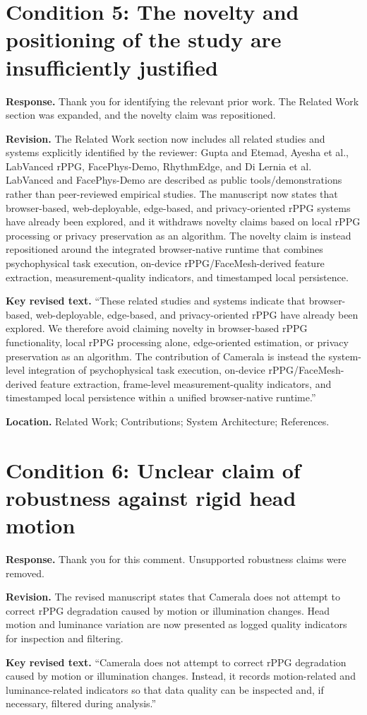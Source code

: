 \documentclass[11pt]{article}
\newcommand{\condition}[2]{\section*{Condition #1: #2}}
\begin{document}
\condition{5}{The novelty and positioning of the study are insufficiently justified}
\textbf{Response.}
Thank you for identifying the relevant prior work.
The Related Work section was expanded, and the novelty claim was repositioned.

\textbf{Revision.}
The Related Work section now includes all related studies and systems explicitly identified by the reviewer: Gupta and Etemad, Ayesha et al., LabVanced rPPG, FacePhys-Demo, RhythmEdge, and Di Lernia et al.
LabVanced and FacePhys-Demo are described as public tools/demonstrations rather than peer-reviewed empirical studies.
The manuscript now states that browser-based, web-deployable, edge-based, and privacy-oriented rPPG systems have already been explored, and it withdraws novelty claims based on local rPPG processing or privacy preservation as an algorithm.
The novelty claim is instead repositioned around the integrated browser-native runtime that combines psychophysical task execution, on-device rPPG/FaceMesh-derived feature extraction, measurement-quality indicators, and timestamped local persistence.

\textbf{Key revised text.}
``These related studies and systems indicate that browser-based, web-deployable, edge-based, and privacy-oriented rPPG have already been explored. We therefore avoid claiming novelty in browser-based rPPG functionality, local rPPG processing alone, edge-oriented estimation, or privacy preservation as an algorithm. The contribution of Camerala is instead the system-level integration of psychophysical task execution, on-device rPPG/FaceMesh-derived feature extraction, frame-level measurement-quality indicators, and timestamped local persistence within a unified browser-native runtime.''

\textbf{Location.}
Related Work; Contributions; System Architecture; References.

\condition{6}{Unclear claim of robustness against rigid head motion}
\textbf{Response.}
Thank you for this comment.
Unsupported robustness claims were removed.

\textbf{Revision.}
The revised manuscript states that Camerala does not attempt to correct rPPG degradation caused by motion or illumination changes.
Head motion and luminance variation are now presented as logged quality indicators for inspection and filtering.

\textbf{Key revised text.}
``Camerala does not attempt to correct rPPG degradation caused by motion or illumination changes. Instead, it records motion-related and luminance-related indicators so that data quality can be inspected and, if necessary, filtered during analysis.''
\end{document}
